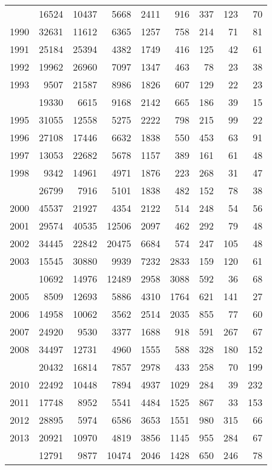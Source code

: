 \documentclass[
]{article}
\begin{document}
\begin{longtable}[t]{lrrrrrrrr}
\endfoot
\bottomrule
\endlastfoot
1989 & 16524 & 10437 & 5668 & 2411 & 916 & 337 & 123 & 70\\
1990 & 32631 & 11612 & 6365 & 1257 & 758 & 214 & 71 & 81\\
1991 & 25184 & 25394 & 4382 & 1749 & 416 & 125 & 42 & 61\\
1992 & 19962 & 26960 & 7097 & 1347 & 463 & 78 & 23 & 38\\
1993 & 9507 & 21587 & 8986 & 1826 & 607 & 129 & 22 & 23\\
\addlinespace
1994 & 19330 & 6615 & 9168 & 2142 & 665 & 186 & 39 & 15\\
1995 & 31055 & 12558 & 5275 & 2222 & 798 & 215 & 99 & 22\\
1996 & 27108 & 17446 & 6632 & 1838 & 550 & 453 & 63 & 91\\
1997 & 13053 & 22682 & 5678 & 1157 & 389 & 161 & 61 & 48\\
1998 & 9342 & 14961 & 4971 & 1876 & 223 & 268 & 31 & 47\\
\addlinespace
1999 & 26799 & 7916 & 5101 & 1838 & 482 & 152 & 78 & 38\\
2000 & 45537 & 21927 & 4354 & 2122 & 514 & 248 & 54 & 56\\
2001 & 29574 & 40535 & 12506 & 2097 & 462 & 292 & 79 & 48\\
2002 & 34445 & 22842 & 20475 & 6684 & 574 & 247 & 105 & 48\\
2003 & 15545 & 30880 & 9939 & 7232 & 2833 & 159 & 120 & 61\\
\addlinespace
2004 & 10692 & 14976 & 12489 & 2958 & 3088 & 592 & 36 & 68\\
2005 & 8509 & 12693 & 5886 & 4310 & 1764 & 621 & 141 & 27\\
2006 & 14958 & 10062 & 3562 & 2514 & 2035 & 855 & 77 & 60\\
2007 & 24920 & 9530 & 3377 & 1688 & 918 & 591 & 267 & 67\\
2008 & 34497 & 12731 & 4960 & 1555 & 588 & 328 & 180 & 152\\
\addlinespace
2009 & 20432 & 16814 & 7857 & 2978 & 433 & 258 & 70 & 199\\
2010 & 22492 & 10448 & 7894 & 4937 & 1029 & 284 & 39 & 232\\
2011 & 17748 & 8952 & 5541 & 4484 & 1525 & 867 & 33 & 153\\
2012 & 28895 & 5974 & 6586 & 3653 & 1551 & 980 & 315 & 66\\
2013 & 20921 & 10970 & 4819 & 3856 & 1145 & 955 & 284 & 67\\
\addlinespace
2014 & 12791 & 9877 & 10474 & 2046 & 1428 & 650 & 246 & 78\\

\end{longtable}
\end{document}
